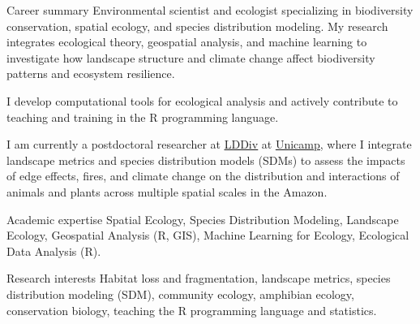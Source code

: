 \documentclass{resume}
\begin{document}

\begin{rSection}{Career summary}
Environmental scientist and ecologist specializing in biodiversity conservation, spatial ecology, and species distribution modeling. My research integrates ecological theory, geospatial analysis, and machine learning to investigate how landscape structure and climate change affect biodiversity patterns and ecosystem resilience.

I develop computational tools for ecological analysis and actively contribute to teaching and training in the R programming language.

I am currently a postdoctoral researcher at \href{https://www.mathiasmpires.net.br/index.html}{\underline{LDDiv}} at \href{https://unicamp.br/}{\underline{Unicamp}}, where I integrate landscape metrics and species distribution models (SDMs) to assess the impacts of edge effects, fires, and climate change on the distribution and interactions of animals and plants across multiple spatial scales in the Amazon.
\end{rSection}


\begin{rSection}{Academic expertise}
Spatial Ecology, Species Distribution Modeling, Landscape Ecology, Geospatial Analysis (R, GIS), Machine Learning for Ecology, Ecological Data Analysis (R).
\end{rSection}


\begin{rSection}{Research interests}
Habitat loss and fragmentation, landscape metrics, species distribution modeling (SDM), community ecology, amphibian ecology, conservation biology, teaching the R programming language and statistics.
\end{rSection}

\end{document}
